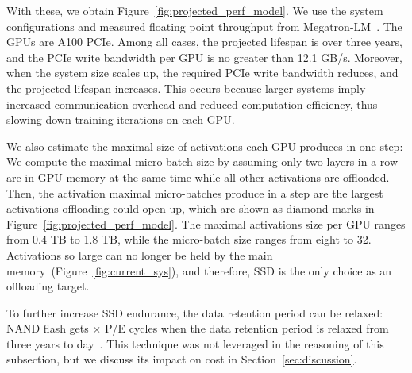 With these, we obtain Figure~\ref{fig:projected_perf_model}. We use the system configurations and measured floating point throughput from Megatron-LM~\cite{shoeybiMegatronLMTrainingMultiBillion2020a}. The GPUs are A100 PCIe. Among all cases, the projected lifespan is over three years, and the PCIe write bandwidth per GPU is no greater than 12.1 GB/s.
Moreover, when the system size scales up, the required PCIe write bandwidth reduces, and the projected lifespan increases. This occurs because larger systems imply increased communication overhead and reduced computation efficiency, thus slowing down training iterations on each GPU. 

We also estimate the maximal size of activations each GPU produces in one step: We compute the maximal micro-batch size by assuming only two layers in a row are in GPU memory at the same time while all other activations are offloaded. Then, the activation maximal micro-batches produce in a step are the largest activations offloading could open up, which are shown as diamond marks in Figure~\ref{fig:projected_perf_model}. The maximal activations size per GPU ranges from 0.4 TB to 1.8 TB, while the micro-batch size ranges from eight to 32. Activations so large can no longer be held by the main memory~(Figure~\ref{fig:current_sys}), and therefore, SSD is the only choice as an offloading target.



To further increase SSD endurance, the data retention period can be relaxed: NAND flash gets $\times$ P/E cycles when the data retention period is relaxed from three years to  day~\cite{caiFlashCorrectandrefreshRetentionaware2012,yucaiErrorPatternsMLC2012,liuOptimizingNANDFlashBased2012,kimBehemothFlashcentricTraining2021}. This technique was not leveraged in the reasoning of this subsection, but we discuss its impact on cost in Section~\ref{sec:discussion}.

